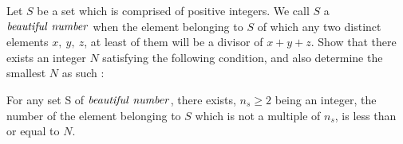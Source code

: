Let $S$ be a set which is comprised of positive integers. We call $S$ a $\it{beautiful\ number}$ when the element belonging to $S$ of which any two distinct elements $x,\ y,\ z$, at least of them  will be a divisor of $x+y+z$. Show that there exists an integer $N$ satisfying the following condition, and also determine the smallest $N$ as such :

For any set S of $\it{beautiful\ number}$, there exists, $n_{s}\geq 2$  being an integer, the number of the element belonging to $S$ which is not a multiple of $n_s$, is less than or equal to $N$.
